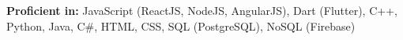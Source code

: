 \textbf{Proficient in:} JavaScript (ReactJS, NodeJS, AngularJS), Dart (Flutter), C++, Python, Java, C\#, HTML, CSS, SQL (PostgreSQL), NoSQL (Firebase)
